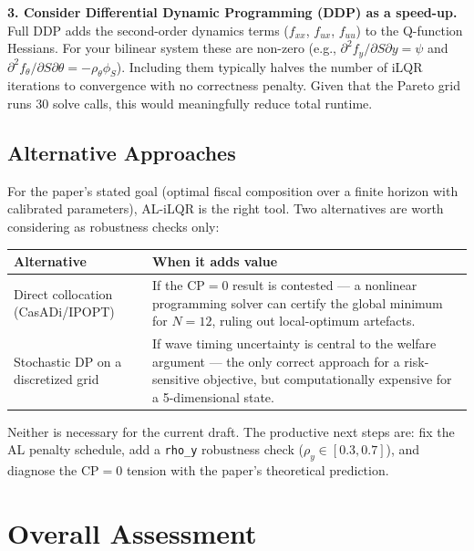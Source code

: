 \documentclass[12pt, a4paper]{article}
\begin{document}
\textbf{3. Consider Differential Dynamic Programming (DDP) as a speed-up.}
Full DDP adds the second-order dynamics terms ($f_{xx}$, $f_{ux}$, $f_{uu}$) to the
Q-function Hessians. For your bilinear system these are non-zero (e.g.,
$\partial^2 f_y / \partial S \partial y = \psi$ and
$\partial^2 f_\theta / \partial S \partial \theta = -\rho_\theta \phi_S$). Including
them typically halves the number of iLQR iterations to convergence with no correctness
penalty. Given that the Pareto grid runs 30 solve calls, this would meaningfully reduce
total runtime.

\subsection{Alternative Approaches}

For the paper's stated goal (optimal fiscal composition over a finite horizon with
calibrated parameters), AL-iLQR is the right tool. Two alternatives are worth
considering as robustness checks only:

\begin{center}
\small
\begin{tabular}{lp{9cm}}
\toprule
Alternative & When it adds value \\
\midrule
Direct collocation (CasADi/IPOPT) &
    If the CP$=0$ result is contested --- a nonlinear programming solver can certify the
    global minimum for $N=12$, ruling out local-optimum artefacts. \\[4pt]
Stochastic DP on a discretized grid &
    If wave timing uncertainty is central to the welfare argument --- the only correct
    approach for a risk-sensitive objective, but computationally expensive for a
    5-dimensional state. \\
\bottomrule
\end{tabular}
\end{center}

Neither is necessary for the current draft. The productive next steps are: fix the AL
penalty schedule, add a \texttt{rho\_y} robustness check ($\rho_y \in [0.3, 0.7]$), and
diagnose the CP$=0$ tension with the paper's theoretical prediction.

\section{Overall Assessment}
\end{document}
